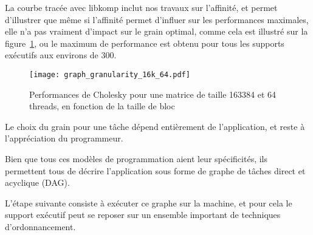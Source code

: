 La courbe tracée avec libkomp inclut nos travaux sur l'affinité, et permet d'illustrer que même si l'affinité permet d'influer sur les performances maximales, elle n'a pas vraiment d'impact sur le grain optimal, comme cela est illustré sur la figure~\ref{fig:context:granularity-16k}, ou le maximum de performance est obtenu pour tous les supports exécutifs aux environs de 300.


\begin{figure}[ht]
  \centering
  \texttt{[image: graph\_granularity\_16k\_64.pdf]}
  \caption{Performances de Cholesky pour une matrice de taille 163384 et 64 threads, en fonction de la taille de bloc}\label{fig:context:granularity-16k}
\end{figure}


Le choix du grain pour une tâche dépend entièrement de l'application, et reste à l'appréciation du programmeur.

\bigskip

Bien que tous ces modèles de programmation aient leur spécificités, ils permettent tous de décrire l'application sous forme de graphe de tâches direct et acyclique (DAG).

L'étape suivante consiste à exécuter ce graphe sur la machine, et pour cela le support exécutif peut se reposer sur un ensemble important de techniques d'ordonnancement. 


